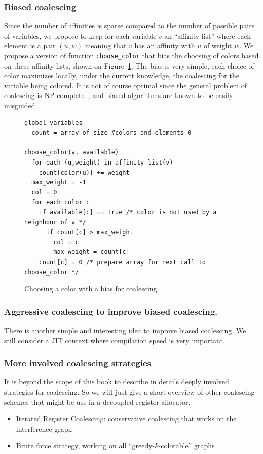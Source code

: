 {\subsubsection{Biased coalescing}

Since the number of affinities is sparse compared to the number of possible pairs of variables, we propose to keep for each variable $v$ an ``affinity list'' where each element is a pair $(u,w)$ meaning that $v$ has an affinity with $u$ of weight $w$.
We propose a version of function {\tt choose\_color} that bias the choosing of colors based on these affinity lists, shown on Figure~\ref{code:choose-color}. 
The bias is very simple, each choice of color maximizes locally, under the current knowledge, the coalescing for the variable being colored. 
It is not of course optimal since the general problem of coalescing is NP-complete~\cite{BouchezDR07:coalescing-cplx}, and biased algorithms are known to be easily misguided. 


\begin{figure}
  \begin{verbatim}
global variables
  count = array of size #colors and elements 0

choose_color(v, available)
  for each (u,weight) in affinity_list(v)
    count[color(u)] += weight
  max_weight = -1
  col = 0
  for each color c
    if available[c] == true /* color is not used by a neighbour of v */
      if count[c] > max_weight
        col = c
        max_weight = count[c]
    count[c] = 0 /* prepare array for next call to choose_color */
  \end{verbatim}
  \caption{Choosing a color with a bias for coalescing.}
  \label{code:choose-color}
\end{figure}


\subsubsection{Aggressive coalescing to improve biased coalescing.}

There is another simple and interesting idea to improve biased coalescing. We 
still consider a JIT context where compilation speed is very important.


\subsubsection{More involved coalescing strategies}

It is beyond the scope of this book to describe in details deeply involved strategies for coalescing.
So we will just give a short overview of other coalescing schemes that might be use in a decoupled register allocator.
\begin{itemize}
  \item Iterated Register Coalescing: conservative coalescing that works on the interference graph
  \item Brute force strategy, working on all ``greedy-$k$-colorable'' graphs
\end{itemize}




}
